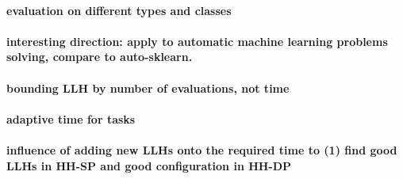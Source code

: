 \paragraph{evaluation on different types and classes}
\paragraph{interesting direction: apply to automatic machine learning problems solving, compare to auto-sklearn.}
\paragraph{bounding LLH by number of evaluations, not time}
\paragraph{adaptive time for tasks}
\paragraph{influence of adding new LLHs onto the required time to (1) find good LLHs in HH-SP and good configuration in HH-DP}

